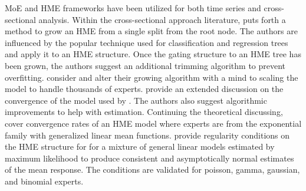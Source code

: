 \documentclass[12pt]{article}
\begin{document}
MoE and HME frameworks have been utilized for both time series and
cross-sectional analysis. Within the cross-sectional approach literature,
\cite{WaterhouseRobinson1995} puts forth a method to grow an HME from a       %
single split from the root node. The authors are influenced by the popular
technique used for classification and regression trees \cite{CART1984} and  %
apply it to an HME structure. Once the gating structure to an HME tree has    
been grown, the authors suggest an additional trimming algorithm to prevent overfitting.   %
\cite{FFW1997} consider \cite{WaterhouseRobinson1995} and alter their       %
growing algorithm with a mind to scaling the model to handle thousands of
experts. \cite{JordanXuConverge1995} provide an extended discussion on the convergence of the %
model used by \cite{JordanJacobs1993}. The authors also suggest
algorithmic improvements to help with estimation. Continuing the theoretical
discussing, \cite{JiangTanner1999} cover convergence rates of an HME model where experts
are from the exponential family with generalized linear mean functions.
\cite{JiangTanner2000} provide regularity conditions on the HME structure for
for a mixture of general linear models estimated by maximum likelihood to
produce consistent and asymptotically normal estimates of the mean response.
The conditions are validated for poisson, gamma, gaussian, and binomial experts.
\end{document}
